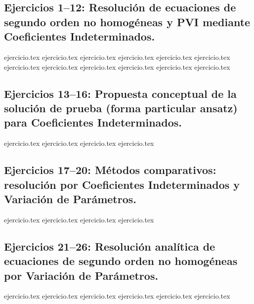 
\subsection*{Ejercicios 1--12: Resolución de ecuaciones de segundo orden no homogéneas y PVI mediante Coeficientes Indeterminados.}
\begin{enumerate}
    {ejercicio.tex}
    {ejercicio.tex}
    {ejercicio.tex}
    {ejercicio.tex}
    {ejercicio.tex}
    {ejercicio.tex}
    {ejercicio.tex}
    {ejercicio.tex}
    {ejercicio.tex}
    {ejercicio.tex}
    {ejercicio.tex}
    {ejercicio.tex}
\end{enumerate}

\subsection*{Ejercicios 13--16: Propuesta conceptual de la solución de prueba (forma particular ansatz) para Coeficientes Indeterminados.}
\begin{enumerate}
    \setcounter{enumi}{12}
    {ejercicio.tex}
    {ejercicio.tex}
    {ejercicio.tex}
    {ejercicio.tex}
\end{enumerate}

\subsection*{Ejercicios 17--20: Métodos comparativos: resolución por Coeficientes Indeterminados y Variación de Parámetros.}
\begin{enumerate}
    \setcounter{enumi}{16}
    {ejercicio.tex}
    {ejercicio.tex}
    {ejercicio.tex}
    {ejercicio.tex}
\end{enumerate}

\subsection*{Ejercicios 21--26: Resolución analítica de ecuaciones de segundo orden no homogéneas por Variación de Parámetros.}
\begin{enumerate}
    \setcounter{enumi}{20}
    {ejercicio.tex}
    {ejercicio.tex}
    {ejercicio.tex}
    {ejercicio.tex}
    {ejercicio.tex}
    {ejercicio.tex}
\end{enumerate}
